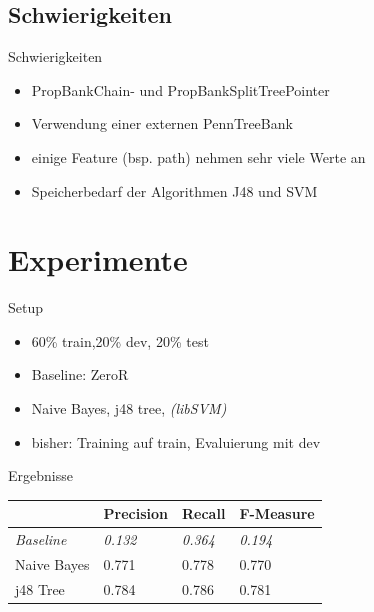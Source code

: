 \documentclass[10pt]{beamer}
\begin{document}
\subsection{Schwierigkeiten}
\begin{frame}{Schwierigkeiten}
	\begin{itemize}
		\item PropBankChain- und PropBankSplitTreePointer
		\item Verwendung einer externen PennTreeBank
		\item einige Feature (bsp. path) nehmen sehr viele Werte an
		\item Speicherbedarf der Algorithmen J48 und SVM
	\end{itemize}
\end{frame}

\section{Experimente}
\begin{frame}{Setup}

\begin{itemize}
	\item 60\% train,20\% dev, 20\% test
	\item Baseline: ZeroR
	\item Naive Bayes, j48 tree, \textit{(libSVM)} 
	\item bisher: Training auf train, Evaluierung mit dev
\end{itemize}

\end{frame}

\begin{frame}{Ergebnisse}
\begin{table}[h]
\begin{tabular}{l|lll}
                  & Precision      & Recall         & F-Measure      \\ \hline
\textit{Baseline} & \textit{0.132} & \textit{0.364} & \textit{0.194} \\ \hline
Naive Bayes       & 0.771          & 0.778          & 0.770          \\
j48 Tree          & 0.784      	   & 0.786             & 0.781            
\end{tabular}
\end{table}
\end{frame}
\end{document}
